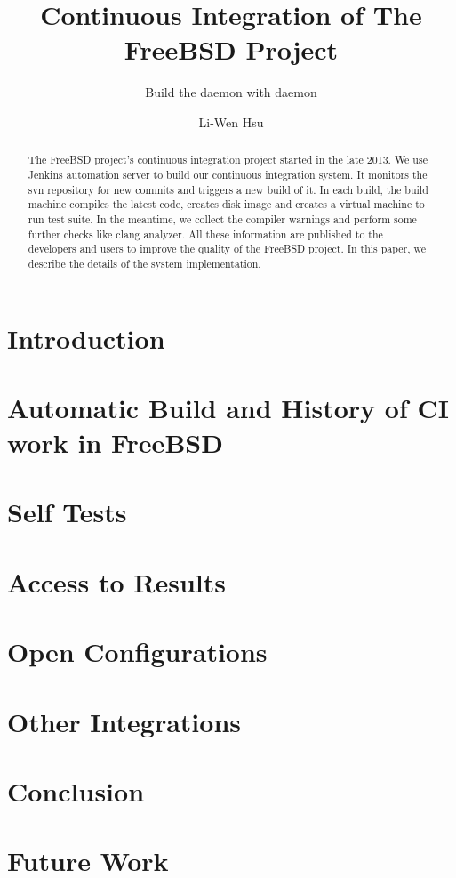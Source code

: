 \documentclass[sigconf]{acmart}
\begin{document}
\title{Continuous Integration of The FreeBSD Project}
\subtitle{Build the daemon with daemon}

\author{Li-Wen Hsu}

\begin{abstract}
The FreeBSD project's continuous integration project started in the late 2013.
We use Jenkins automation server to build our continuous integration system.
It monitors the svn repository for new commits and triggers a new build of it.
In each build, the build machine compiles the latest code, creates disk image
and creates a virtual machine to run test suite. In the meantime, we collect
the compiler warnings and perform some further checks like clang analyzer. All
these information are published to the developers and users to improve the
quality of the FreeBSD project. In this paper, we describe the details of the
system implementation.
\end{abstract}


\maketitle

\section{Introduction}

\section{Automatic Build and History of CI work in FreeBSD}

\section{Self Tests}

\section{Access to Results}

\section{Open Configurations}

\section{Other Integrations}

\section{Conclusion}

\section{Future Work}


 
\end{document}
